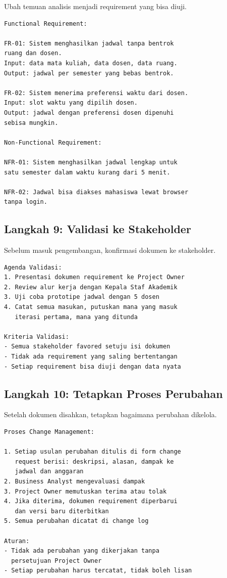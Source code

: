 \documentclass[11pt,a4paper]{article}
\begin{document}
Ubah temuan analisis menjadi requirement yang bisa diuji.

\begin{lstlisting}[style=out]
Functional Requirement:

FR-01: Sistem menghasilkan jadwal tanpa bentrok
ruang dan dosen.
Input: data mata kuliah, data dosen, data ruang.
Output: jadwal per semester yang bebas bentrok.

FR-02: Sistem menerima preferensi waktu dari dosen.
Input: slot waktu yang dipilih dosen.
Output: jadwal dengan preferensi dosen dipenuhi
sebisa mungkin.

Non-Functional Requirement:

NFR-01: Sistem menghasilkan jadwal lengkap untuk
satu semester dalam waktu kurang dari 5 menit.

NFR-02: Jadwal bisa diakses mahasiswa lewat browser
tanpa login.
\end{lstlisting}

\subsection{Langkah 9: Validasi ke Stakeholder}

Sebelum masuk pengembangan, konfirmasi dokumen ke stakeholder.

\begin{lstlisting}[style=out]
Agenda Validasi:
1. Presentasi dokumen requirement ke Project Owner
2. Review alur kerja dengan Kepala Staf Akademik
3. Uji coba prototipe jadwal dengan 5 dosen
4. Catat semua masukan, putuskan mana yang masuk
   iterasi pertama, mana yang ditunda

Kriteria Validasi:
- Semua stakeholder favored setuju isi dokumen
- Tidak ada requirement yang saling bertentangan
- Setiap requirement bisa diuji dengan data nyata
\end{lstlisting}

\subsection{Langkah 10: Tetapkan Proses Perubahan}

Setelah dokumen disahkan, tetapkan bagaimana perubahan dikelola.

\begin{lstlisting}[style=out]
Proses Change Management:

1. Setiap usulan perubahan ditulis di form change
   request berisi: deskripsi, alasan, dampak ke
   jadwal dan anggaran
2. Business Analyst mengevaluasi dampak
3. Project Owner memutuskan terima atau tolak
4. Jika diterima, dokumen requirement diperbarui
   dan versi baru diterbitkan
5. Semua perubahan dicatat di change log

Aturan:
- Tidak ada perubahan yang dikerjakan tanpa
  persetujuan Project Owner
- Setiap perubahan harus tercatat, tidak boleh lisan
\end{lstlisting}
\end{document}
